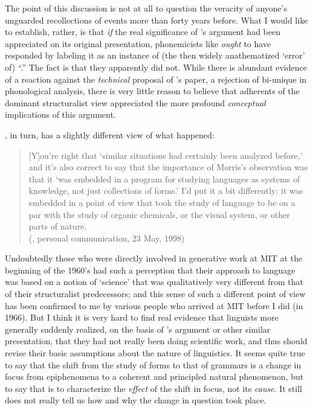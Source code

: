 The point of this discussion is not at all to question the veracity of
anyone's unguarded recollections of events more than forty years
before.  What I would like to establish, rather, is that \emph{if} the
real significance of {\Halle}'s argument had been appreciated on its
original presentation, phonemicists like {\Bloch} \emph{ought} to have
responded by labeling it as an instance of (the then widely
anathematized `error' of) ``.'' The fact is that they
apparently did not. While there is abundant evidence of a reaction
against the \emph{technical} proposal of {\Halle}'s paper, a rejection of
bi-unique  in phonological analysis, there is
very little reason to believe that adherents of the dominant
structuralist view appreciated the more profound \emph{conceptual}
implications of this argument.
  
{\Chomsky}, in turn, has a slightly different view of what happened:
\begin{quotation}
  {[Y]}ou're right that `similar situations had certainly been
  analyzed before,' and it's also correct to say that the importance
  of Morris's observation was that it `was embedded in a program for
  studying languages as systems of knowledge, not just collections of
  forms.' I'd put it a bit differently: it was embedded in a point of
  view that took the study of language to be on a par with the study
  of organic chemicals, or the visual system, or other parts of
  nature.\\
  ({\Chomsky}, personal communication, 23 May, 1998)
\end{quotation}

Undoubtedly those who were directly involved in generative work at MIT
at the beginning of the 1960's had such a perception that their
approach to language was based on a notion of `science' that was
qualitatively very different from that of their structuralist
predecessors; and this sense of such a different point of view has
been confirmed to me by various people who arrived at MIT before I did
(in 1966). But I think it is very hard to find real evidence that
linguists more generally suddenly realized, on the basis of {\Halle}'s
argument or other similar presentation, that they had not really been
doing scientific work, and thus should revise their basic assumptions
about the nature of linguistics. It seems quite true to say that the
shift from the study of forms to that of grammars is a {change} in focus
from epiphenomena to a coherent and principled natural phenomenon, but
to say that is to characterize the \emph{effect} of the shift in
focus, not its \emph{cause}.  It still does not really tell us how and
why the {change} in question took place.
  
